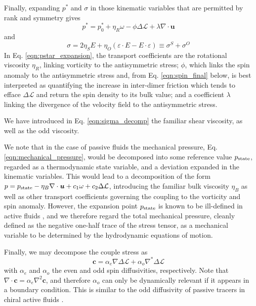 \documentclass[%
 reprint,
superscriptaddress,
longbibliography,
 amsmath,amssymb,
 prl,
 citeautoscript,
]{revtex4-1}
\begin{document}
Finally, expanding $p^*$ and $\sigma$ in those kinematic variables that are permitted by rank and symmetry gives
\begin{equation}
p^* = p^*_0 + \eta_R \omega - \phi \Delta \mathcal{L} + \lambda \nabla \cdot {\boldsymbol u}
\label{eqn:pstar_expansion}
\end{equation}
and
\begin{equation}
\sigma = 2 \eta_S E + \eta_O \left( \varepsilon \cdot E - E \cdot \varepsilon \right) \equiv \sigma^S + \sigma^O
\label{eqn:sigma_decomp}
\end{equation}
In Eq. \ref{eqn:pstar_expansion}, the transport coefficients are the rotational viscosity $\eta_R$, linking vorticity to the antisymmetric stress; $\phi$, which links the spin anomaly to the antisymmetric stress and, from Eq. \ref{eqn:spin_final} below, is best interpreted as quantifying the increase in inter-dimer friction which tends to efface $\Delta \mathcal{L}$ and return the spin density to its bulk value; and a coefficient $\lambda$ linking the divergence of the velocity field to the antisymmetric stress.

We have introduced in Eq. \ref{eqn:sigma_decomp} the familiar shear viscosity, as well as the odd viscosity.

We note that in the case of passive fluids the mechanical pressure, Eq. \ref{eqn:mechanical_pressure}, would be decomposed into some reference value $p_{\rm state}$, regarded as a thermodynamic state variable, and a deviation expanded in the kinematic variables. This would lead to a decomposition of the form $p = p_{\rm state} - \eta_B \nabla \cdot {\boldsymbol u} + c_1 \omega + c_2 \Delta \mathcal{L}$, introducing the familiar bulk viscosity $\eta_B$ as well as other transport coefficients governing the coupling to the vorticity and spin anomaly. However, the expansion point $p_{\rm state}$ is known to be ill-defined in active fluids \cite{active_pressure1, active_pressure2}, and we therefore regard the total mechanical pressure, cleanly defined as the negative one-half trace of the stress tensor, as a mechanical variable to be determined by the hydrodynamic equations of motion.

Finally, we may decompose the couple stress as
\begin{equation}
{\boldsymbol c} = \alpha_e \nabla \Delta \mathcal{L} + \alpha_o \nabla^* \Delta \mathcal{L}
\label{eqn:couple_stress}
\end{equation}
with $\alpha_e$ and $\alpha_o$ the even and odd spin diffusivities, respectively. Note that $\nabla \cdot {\boldsymbol c} = \alpha_e \nabla^2 {\boldsymbol c}$, and therefore $\alpha_o$ can only be dynamically relevant if it appears in a boundary condition. This is similar to the odd diffusivity of passive tracers in chiral active fluids \cite{Cory_odd_diffusivity, my_PRL}.
\end{document}

